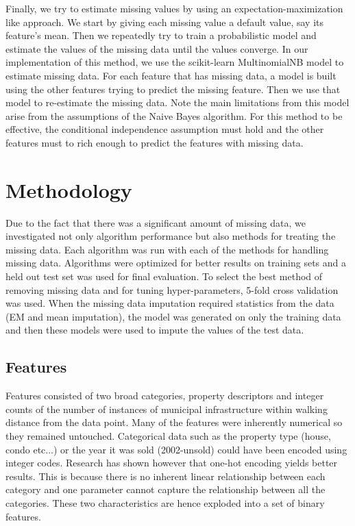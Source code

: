 \documentclass{acm_proc_article-sp}
\begin{document}
	Finally, we try to estimate missing values by using an expectation-maximization like approach. We start by giving each missing value a default value, say its feature's mean. Then we repeatedly try to train a probabilistic model and estimate the values of the missing data until the values converge. In our implementation of this method, we use the scikit-learn MultinomialNB model to estimate missing data. For each feature that has missing data, a model is built using the other features trying to predict the missing feature. Then we use that model to re-estimate the missing data. Note the main limitations from this model arise from the assumptions of the Naive Bayes algorithm. For this method to be effective, the conditional independence assumption must hold and the other features must to rich enough to predict the features with missing data.
	
\section{Methodology}
	
	Due to the fact that there was a significant amount of missing data, we investigated not only algorithm performance but also methods for treating the missing data. Each algorithm was run with each of the methods for handling missing data. Algorithms were optimized for better results on training sets and a held out test set was used for final evaluation. To select the best method of removing missing data and for tuning hyper-parameters, 5-fold cross validation was used. When the missing data imputation required statistics from the data (EM and mean imputation), the model was generated on only the training data and then these models were used to impute the values of the test data.
	
\subsection{Features}
	
	Features consisted of two broad categories, property descriptors and integer counts of the number of instances of municipal infrastructure within walking distance from the data point. Many of the features were inherently numerical so they remained untouched. Categorical data such as the property type (house, condo etc...) or the year it was sold (2002-unsold) could have been encoded using integer codes. Research has shown however that one-hot encoding yields better results. \cite{onehot} This is because there is no inherent linear relationship between each category and one parameter cannot capture the relationship between all the categories. These two characteristics are hence exploded into a set of binary features.
	
\end{document}
